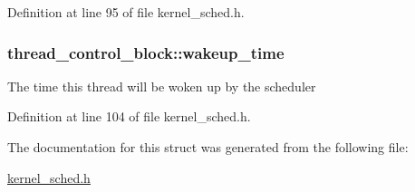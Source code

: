 Definition at line 95 of file kernel\+\_\+sched.\+h.

\subsubsection[{\texorpdfstring{wakeup\+\_\+time}{wakeup_time}}]{ thread\+\_\+control\+\_\+block\+::wakeup\+\_\+time}\hypertarget{structthread__control__block_a7dbf9ba7df67911abb7951e249f587b6}{}\label{structthread__control__block_a7dbf9ba7df67911abb7951e249f587b6}
The time this thread will be woken up by the scheduler 

Definition at line 104 of file kernel\+\_\+sched.\+h.



The documentation for this struct was generated from the following file\+:\begin{DoxyCompactItemize}
\item 
\hyperlink{kernel__sched_8h}{kernel\+\_\+sched.\+h}\end{DoxyCompactItemize}
